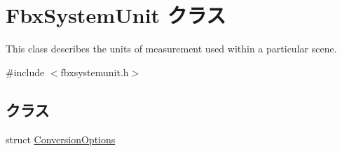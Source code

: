 \hypertarget{class_fbx_system_unit}{}\section{Fbx\+System\+Unit クラス}
\label{class_fbx_system_unit}


This class describes the units of measurement used within a particular scene.  




{\ttfamily \#include $<$fbxsystemunit.\+h$>$}

\subsection*{クラス}
\begin{DoxyCompactItemize}
\item 
struct \hyperlink{struct_fbx_system_unit_1_1_conversion_options}{Conversion\+Options}
\end{DoxyCompactItemize}
